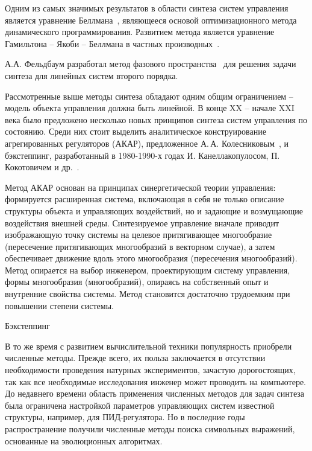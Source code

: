Одним из самых значимых результатов в области синтеза систем управления является уравнение Беллмана~\cite{Bellman1957, Болтянский1968}, являющееся основой оптимизационного метода динамического программирования. 
Развитием метода является уравнение Гамильтона -- Якоби -- Беллмана в частных производных~\cite{Кружков1975}.

А.А. Фельдбаум разработал метод фазового пространства~\cite{Фельдбаум1953, Фельдбаум1955} для решения задачи синтеза для линейных систем второго порядка.

Рассмотренные выше методы синтеза обладают одним общим ограничением -- модель объекта управления должна быть линейной. 
В конце XX -- начале XXI века было предложено несколько новых принципов синтеза систем управления по состоянию.
Среди них стоит выделить аналитическое конструирование агрегированных регуляторов (АКАР), предложенное А.\,А. Колесниковым~\cite{Колесников2006, Колесников1994}, и бэкстеппинг, разработанный в 1980-1990-х годах И. Канеллакопулосом, П. Кокотовичем и др.~\cite{Kanellakopoulos1989, Kanellakopoulos1991, Krstic1995}.

Метод АКАР основан на принципах синергетической теории управления: формируется расширенная система, включающая в себя не только описание структуры объекта и управляющих воздействий, но и задающие и возмущающие воздействия внешней среды.
Синтезируемое управление вначале приводит изображающую точку системы на целевое притягивающее многообразие (пересечение притягивающих многообразий в векторном случае), а затем обеспечивает движение вдоль этого многообразия (пересечения многообразий). 
Метод опирается на выбор инженером, проектирующим систему управления, формы многообразия (многообразий), опираясь на собственный опыт и внутренние свойства системы. Метод становится достаточно трудоемким при повышении степени системы.

Бэкстеппинг 

В то же время с развитием вычислительной техники популярность приобрели численные методы.
Прежде всего, их польза заключается в отсутствии необходимости проведения натурных экспериментов, зачастую дорогостоящих, так как все необходимые исследования инженер может проводить на компьютере.
До недавнего времени область применения численных методов для задач синтеза была ограничена настройкой параметров управляющих систем известной структуры, например, для ПИД-регулятора.
Но в последние годы распространение получили численные методы поиска символьных выражений, основанные на эволюционных алгоритмах.

